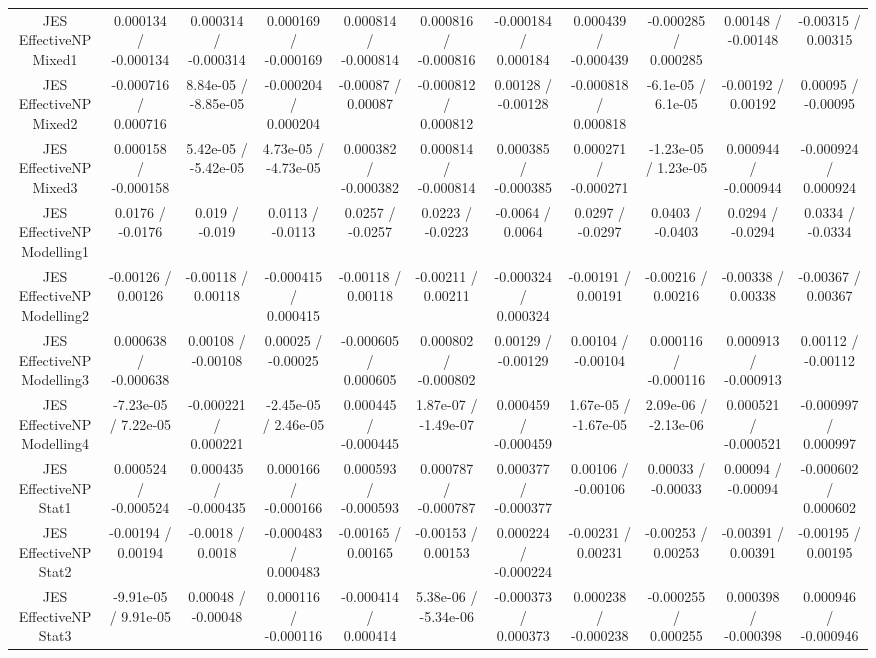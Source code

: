 \begin{table}[htbp]
\begin{center}
\begin{tabular}{|c|c|c|c|c|c|c|c|c|c|c|}
  JES EffectiveNP Mixed1 & 0.000134 / -0.000134 & 0.000314 / -0.000314 & 0.000169 / -0.000169 & 0.000814 / -0.000814 & 0.000816 / -0.000816 & -0.000184 / 0.000184 & 0.000439 / -0.000439 & -0.000285 / 0.000285 & 0.00148 / -0.00148 & -0.00315 / 0.00315 \\ 
  JES EffectiveNP Mixed2 & -0.000716 / 0.000716 & 8.84e-05 / -8.85e-05 & -0.000204 / 0.000204 & -0.00087 / 0.00087 & -0.000812 / 0.000812 & 0.00128 / -0.00128 & -0.000818 / 0.000818 & -6.1e-05 / 6.1e-05 & -0.00192 / 0.00192 & 0.00095 / -0.00095 \\ 
  JES EffectiveNP Mixed3 & 0.000158 / -0.000158 & 5.42e-05 / -5.42e-05 & 4.73e-05 / -4.73e-05 & 0.000382 / -0.000382 & 0.000814 / -0.000814 & 0.000385 / -0.000385 & 0.000271 / -0.000271 & -1.23e-05 / 1.23e-05 & 0.000944 / -0.000944 & -0.000924 / 0.000924 \\ 
  JES EffectiveNP Modelling1 & 0.0176 / -0.0176 & 0.019 / -0.019 & 0.0113 / -0.0113 & 0.0257 / -0.0257 & 0.0223 / -0.0223 & -0.0064 / 0.0064 & 0.0297 / -0.0297 & 0.0403 / -0.0403 & 0.0294 / -0.0294 & 0.0334 / -0.0334 \\ 
  JES EffectiveNP Modelling2 & -0.00126 / 0.00126 & -0.00118 / 0.00118 & -0.000415 / 0.000415 & -0.00118 / 0.00118 & -0.00211 / 0.00211 & -0.000324 / 0.000324 & -0.00191 / 0.00191 & -0.00216 / 0.00216 & -0.00338 / 0.00338 & -0.00367 / 0.00367 \\ 
  JES EffectiveNP Modelling3 & 0.000638 / -0.000638 & 0.00108 / -0.00108 & 0.00025 / -0.00025 & -0.000605 / 0.000605 & 0.000802 / -0.000802 & 0.00129 / -0.00129 & 0.00104 / -0.00104 & 0.000116 / -0.000116 & 0.000913 / -0.000913 & 0.00112 / -0.00112 \\ 
  JES EffectiveNP Modelling4 & -7.23e-05 / 7.22e-05 & -0.000221 / 0.000221 & -2.45e-05 / 2.46e-05 & 0.000445 / -0.000445 & 1.87e-07 / -1.49e-07 & 0.000459 / -0.000459 & 1.67e-05 / -1.67e-05 & 2.09e-06 / -2.13e-06 & 0.000521 / -0.000521 & -0.000997 / 0.000997 \\ 
  JES EffectiveNP Stat1 & 0.000524 / -0.000524 & 0.000435 / -0.000435 & 0.000166 / -0.000166 & 0.000593 / -0.000593 & 0.000787 / -0.000787 & 0.000377 / -0.000377 & 0.00106 / -0.00106 & 0.00033 / -0.00033 & 0.00094 / -0.00094 & -0.000602 / 0.000602 \\ 
  JES EffectiveNP Stat2 & -0.00194 / 0.00194 & -0.0018 / 0.0018 & -0.000483 / 0.000483 & -0.00165 / 0.00165 & -0.00153 / 0.00153 & 0.000224 / -0.000224 & -0.00231 / 0.00231 & -0.00253 / 0.00253 & -0.00391 / 0.00391 & -0.00195 / 0.00195 \\ 
  JES EffectiveNP Stat3 & -9.91e-05 / 9.91e-05 & 0.00048 / -0.00048 & 0.000116 / -0.000116 & -0.000414 / 0.000414 & 5.38e-06 / -5.34e-06 & -0.000373 / 0.000373 & 0.000238 / -0.000238 & -0.000255 / 0.000255 & 0.000398 / -0.000398 & 0.000946 / -0.000946 \\ 

\end{tabular}
\end{center}
\end{table}
